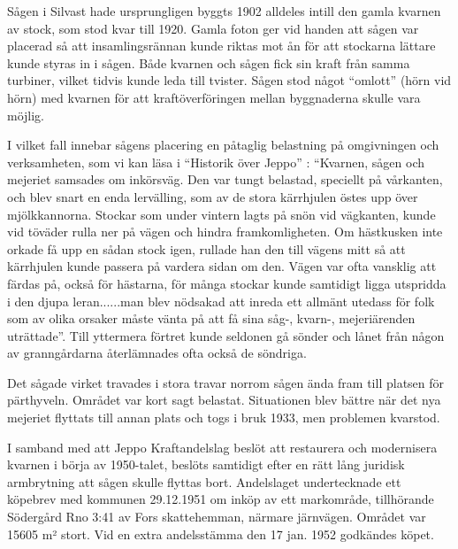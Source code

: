 %

\jhnooccupant{}

Sågen i Silvast hade ursprungligen byggts 1902 alldeles intill den gamla kvarnen av stock, som stod kvar till 1920. Gamla foton ger vid handen att sågen var placerad så att insamlingsrännan kunde riktas mot ån för att stockarna lättare kunde styras in i sågen. Både kvarnen och sågen fick sin kraft från samma turbiner, vilket tidvis kunde leda till tvister. Sågen stod något ``omlott'' (hörn vid hörn) med kvarnen för att kraftöverföringen mellan byggnaderna skulle vara möjlig.

I vilket fall innebar sågens placering en påtaglig belastning på omgivningen och verksamheten, som vi kan läsa i ``Historik över Jeppo'' : ``Kvarnen, sågen och mejeriet samsades om inkörsväg. Den var tungt belastad, speciellt på vårkanten, och blev snart en enda lervälling, som av de stora kärrhjulen östes upp över mjölkkannorna. Stockar som under vintern lagts på snön vid vägkanten, kunde vid töväder rulla ner på vägen och hindra framkomligheten. Om hästkusken inte orkade få upp en sådan stock igen, rullade han den till vägens mitt så att kärrhjulen kunde passera på vardera sidan om den. Vägen var ofta vansklig att färdas på, också för hästarna, för många stockar kunde samtidigt ligga utspridda i den djupa leran......man blev nödsakad att inreda ett allmänt utedass för folk som av olika orsaker måste vänta på att få sina såg-, kvarn-, mejeriärenden uträttade''. Till yttermera förtret kunde seldonen gå sönder och lånet från någon av granngårdarna återlämnades ofta också de söndriga.

Det sågade virket travades i stora travar norrom sågen ända fram till platsen för pärthyveln. Området var kort sagt belastat. Situationen blev bättre när det nya mejeriet flyttats till annan plats och togs i bruk 1933, men problemen kvarstod.

I samband med att Jeppo Kraftandelslag beslöt att restaurera och modernisera kvarnen i börja av 1950-talet, beslöts samtidigt efter en rätt lång juridisk armbrytning att sågen skulle flyttas bort. Andelslaget undertecknade ett köpebrev med kommunen 29.12.1951 om inköp av ett markområde, tillhörande Södergård Rno 3:41 av Fors skattehemman, närmare järnvägen. Området var 15605 m² stort. Vid en extra andelsstämma den 17 jan. 1952 godkändes köpet.


